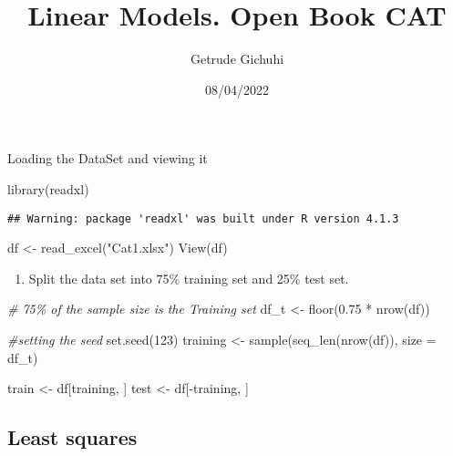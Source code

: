 \documentclass[
]{article}
\title{Linear Models. Open Book CAT}
\author{Getrude Gichuhi}
\date{08/04/2022}
\newenvironment{Shaded}{\begin{snugshade}}{\end{snugshade}}
\newcommand{\AttributeTok}[1]{\textcolor[rgb]{0.77,0.63,0.00}{#1}}
\newcommand{\CommentTok}[1]{\textcolor[rgb]{0.56,0.35,0.01}{\textit{#1}}}
\newcommand{\DecValTok}[1]{\textcolor[rgb]{0.00,0.00,0.81}{#1}}
\newcommand{\FloatTok}[1]{\textcolor[rgb]{0.00,0.00,0.81}{#1}}
\newcommand{\FunctionTok}[1]{\textcolor[rgb]{0.00,0.00,0.00}{#1}}
\newcommand{\NormalTok}[1]{#1}
\newcommand{\OtherTok}[1]{\textcolor[rgb]{0.56,0.35,0.01}{#1}}
\newcommand{\SpecialCharTok}[1]{\textcolor[rgb]{0.00,0.00,0.00}{#1}}
\newcommand{\StringTok}[1]{\textcolor[rgb]{0.31,0.60,0.02}{#1}}
\providecommand{\tightlist}{%
  \setlength{\itemsep}{0pt}\setlength{\parskip}{0pt}}
\begin{document}
\maketitle

Loading the DataSet and viewing it

\begin{Shaded}
\begin{Highlighting}[]
\FunctionTok{library}\NormalTok{(readxl)}
\end{Highlighting}
\end{Shaded}

\begin{verbatim}
## Warning: package 'readxl' was built under R version 4.1.3
\end{verbatim}

\begin{Shaded}
\begin{Highlighting}[]
\NormalTok{df }\OtherTok{\textless{}{-}} \FunctionTok{read\_excel}\NormalTok{(}\StringTok{"Cat1.xlsx"}\NormalTok{)}
\FunctionTok{View}\NormalTok{(df)}
\end{Highlighting}
\end{Shaded}

\begin{enumerate}
\def\labelenumi{(\alph{enumi})}
\tightlist
\item
  Split the data set into 75\% training set and 25\% test set.
\end{enumerate}

\begin{Shaded}
\begin{Highlighting}[]
\CommentTok{\# 75\% of the sample size is the Training set }
\NormalTok{df\_t }\OtherTok{\textless{}{-}} \FunctionTok{floor}\NormalTok{(}\FloatTok{0.75} \SpecialCharTok{*} \FunctionTok{nrow}\NormalTok{(df))}

\CommentTok{\#setting the seed}
\FunctionTok{set.seed}\NormalTok{(}\DecValTok{123}\NormalTok{)}
\NormalTok{training }\OtherTok{\textless{}{-}} \FunctionTok{sample}\NormalTok{(}\FunctionTok{seq\_len}\NormalTok{(}\FunctionTok{nrow}\NormalTok{(df)), }\AttributeTok{size =}\NormalTok{ df\_t)}

\NormalTok{train }\OtherTok{\textless{}{-}}\NormalTok{ df[training, ]}
\NormalTok{test }\OtherTok{\textless{}{-}}\NormalTok{ df[}\SpecialCharTok{{-}}\NormalTok{training, ]}
\end{Highlighting}
\end{Shaded}

\hypertarget{least-squares}{%
\subsection{Least squares}\label{least-squares}}
\end{document}
